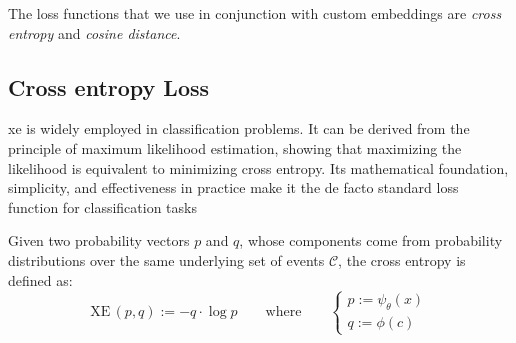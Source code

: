 The loss functions that we use in conjunction with custom embeddings are \emph{cross entropy} and \emph{cosine distance}.


\subsection{Cross entropy Loss}
\label{subsec:cross-entropy-loss}

\acrfull{xe} is widely employed in classification problems. It can be derived from the principle of maximum likelihood estimation, showing that maximizing the likelihood is equivalent to minimizing cross entropy. Its mathematical foundation, simplicity, and effectiveness in practice make it the de facto standard loss function for classification tasks~\cite{ImagenetClassiKrizhe2017, VeryDeepConvoSimony2014, GoingDeeperWiSzeged2014, DeepResidualLHeKa2015, DenselyConnectHuang2016, EfficientnetRTanM2019, Efficientnetv2TanM2021, AnImageIsWorDosovi2020}

Given two probability vectors $p$ and $q$, whose components come from probability distributions over the same underlying set of events $\mathcal{C}$, the cross entropy is defined as:
\begin{equation}
  \textrm{XE} \, (p, q) := - q \cdot \log p
  \label{eq:cross-entropy}
  \qquad \textrm{where} \qquad
  \begin{cases}
    p := \psi_\theta(x) \\
    q := \phi(c)
  \end{cases}
\end{equation}

